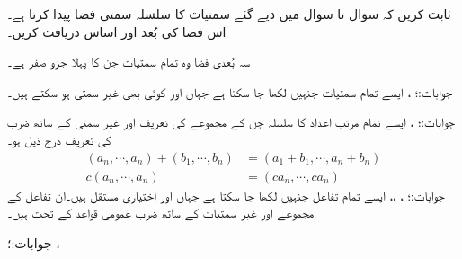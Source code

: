 ثابت کریں کہ سوال  تا سوال  میں دیے گئے سمتیات کا سلسلہ سمتی فضا پیدا کرتا ہے۔اس فضا کی بُعد اور اساس دریافت کریں۔ 

سہ بُعدی فضا وہ تمام سمتیات جن کا پہلا جزو صفر ہے۔

جوابات:؛ ، 
ایسے تمام سمتیات جنہیں  لکھا جا سکتا ہے جہاں  اور  کوئی بھی غیر سمتی ہو سکتے ہیں۔

جوابات:؛ ، 
ایسے تمام  مرتب اعداد  کا سلسلہ جن کے مجموعے کی تعریف  اور غیر سمتی کے ساتھ ضرب کی تعریف درج ذیل ہو۔
\begin{align*}
(a_n,\cdots,a_n)+(b_1,\cdots,b_n)&=(a_1+b_1,\cdots,a_n+b_n)\\
c(a_n,\cdots,a_n)&=(ca_n,\cdots,ca_n)
\end{align*} 
جوابات:؛ ، ،، 
ایسے تمام تفاعل جنہیں  لکھا جا سکتا ہے جہاں  اور  اختیاری مستقل ہیں۔ان تفاعل کے مجموعے اور غیر سمتیات کے ساتھ ضرب عمومی قواعد کے تحت ہیں۔

جوابات:؛ ، 

